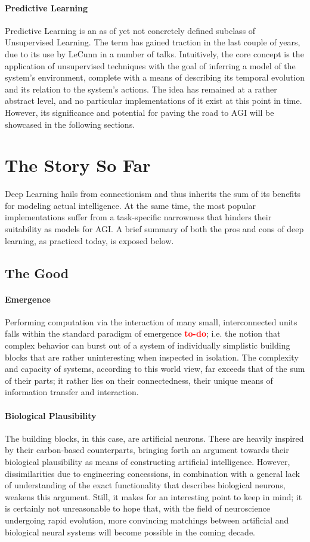 \documentclass[]{article}
\newcommand\todo{\textcolor{red}{\bf{to-do}}}
\begin{document}
\paragraph{Predictive Learning}
Predictive Learning is an as of yet not concretely defined subclass of Unsupervised Learning. The term has gained traction in the last couple of years, due to its use by LeCunn in a number of talks. Intuitively, the core concept is the application of unsupervised techniques with the goal of inferring a model of the system's environment, complete with a means of describing its temporal evolution and its relation to the system's actions. The idea has remained at a rather abstract level, and no particular implementations of it exist at this point in time. However, its significance and potential for paving the road to AGI will be showcased in the following sections.

\section{The Story So Far}
Deep Learning hails from connectionism and thus inherits the sum of its benefits for modeling actual intelligence. At the same time, the most popular implementations suffer from a task-specific narrowness that hinders their suitability as models for AGI. A brief summary of both the pros and cons of deep learning, as practiced today, is exposed below.

\subsection{The Good}

\paragraph{Emergence}
Performing computation via the interaction of many small, interconnected units falls within the standard paradigm of emergence \todo ; i.e. the notion that complex behavior can burst out of a system of individually simplistic building blocks that are rather uninteresting when inspected in isolation. The complexity and capacity of systems, according to this world view, far exceeds that of the sum of their parts; it rather lies on their connectedness, their unique means of information transfer and interaction.

\paragraph{Biological Plausibility}
The building blocks, in this case, are artificial neurons. These are heavily inspired by their carbon-based counterparts, bringing forth an argument towards their biological plausibility as means of constructing artificial intelligence. However, dissimilarities due to engineering concessions, in combination with a general lack of understanding of the exact functionality that describes biological neurons, weakens this argument. Still, it makes for an interesting point to keep in mind; it is certainly not unreasonable to hope that, with the field of neuroscience undergoing rapid evolution, more convincing matchings between artificial and biological neural systems will become possible in the coming decade.
\end{document}
